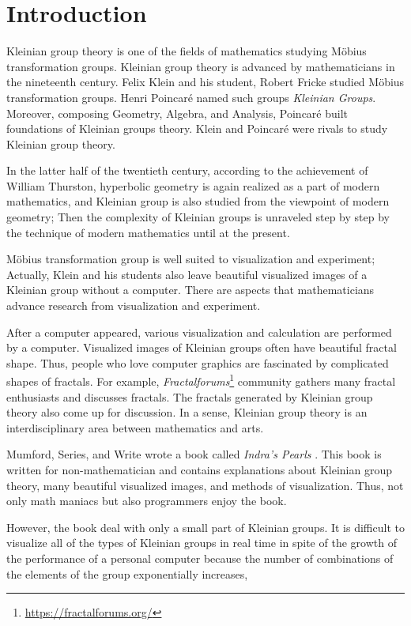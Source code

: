
\section{Introduction}

Kleinian group theory is one of the fields of mathematics studying 
M\"obius transformation groups.
Kleinian group theory is advanced by mathematicians in the nineteenth
century.
Felix Klein and his student, Robert Fricke studied M\"obius
transformation groups.
Henri Poincar\'e named such groups \textit{Kleinian Groups}.
Moreover, composing Geometry, Algebra, and Analysis,
Poincar\'e built foundations of Kleinian groups theory.
Klein and Poincar\'e were rivals to study Kleinian group theory.

In the latter half of the twentieth century, according to the
achievement of William Thurston, hyperbolic geometry is again realized 
as a part of modern mathematics, and Kleinian group is also studied from
the viewpoint of modern geometry;
Then the complexity of Kleinian groups is unraveled step by step by
the technique of modern mathematics until at the present.

M\"obius transformation group is well suited to visualization and
experiment; Actually, Klein and his students also leave beautiful
visualized images of a Kleinian group without a computer.
There are aspects that mathematicians advance research from
visualization and experiment.

After a computer appeared, various visualization and calculation are
performed by a computer.
Visualized images of Kleinian groups often have beautiful fractal shape.
Thus, people who love computer graphics are fascinated by complicated shapes of fractals.
For example,
\textit{Fractalforums}\footnote{\url{https://fractalforums.org/}}
community gathers many fractal enthusiasts and discusses fractals.
The fractals generated by Kleinian group theory also come up for
discussion.
In a sense, Kleinian group theory is an interdisciplinary area between
mathematics and arts.

Mumford, Series, and Write wrote a book called
\textit{Indra's Pearls} \cite{MumfordSeriesWright200204}.
This book is written for non-mathematician and contains explanations
about Kleinian group theory, many beautiful visualized images, and
methods of visualization.
Thus, not only math maniacs but also programmers enjoy the book.

However, the book deal with only a small part of Kleinian groups.
It is difficult to visualize all of the types of Kleinian groups in real
time in spite of the growth of the performance of a personal computer
because the number of combinations of the elements of the group
exponentially increases,

